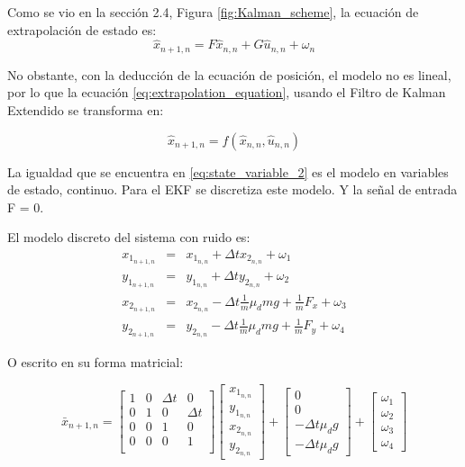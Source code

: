 Como se vio en la sección 2.4, Figura \ref{fig:Kalman_scheme}, la ecuación de extrapolación de estado es:
\begin{equation}
\hat{x}_{n+1,n} = F \hat{x}_{n,n} + G \hat{u}_{n,n} + \omega_n
\label{eq:extrapolation_equation}
\end{equation}

No obstante, con la deducción de la ecuación de posición, el modelo no es lineal, por lo que la ecuación \ref{eq:extrapolation_equation}, usando el Filtro de Kalman Extendido se transforma en:

\begin{equation}
\hat{x}_{n+1,n} = f(\hat{x}_{n,n}, \hat{u}_{n,n}) 
\label{eq:efk}
\end{equation}


La igualdad que se encuentra en \ref{eq:state_variable_2} es el modelo en variables de estado, continuo. Para el EKF se discretiza este modelo. Y la señal de entrada F = 0. 

El modelo discreto del sistema con ruido es:
\begin{eqnarray*}
x_{1_{n+1,n}} &=& x_{1_{n,n}} + \Delta t x_{2_{n,n}} + \omega_1\\ %
y_{1_{n+1,n}} &=& y_{1_{n,n}} + \Delta t y_{2_{n,n}} + \omega_2\\ %
x_{2_{n+1,n}} &=& x_{2_{n,n}} - \Delta t \frac{1}{m}\mu_d m g + \frac{1}{m} F_x + \omega_3\\ %
y_{2_{n+1,n}} &=& y_{2_{n,n}} - \Delta t \frac{1}{m}\mu_d m g + \frac{1}{m} F_y + \omega_4 %
\end{eqnarray*}

O escrito en su forma matricial:

\begin{equation}
\bar{x}_{n+1,n} =
\begin{bmatrix}
1 & 0 & \Delta t & 0\\ 
0 & 1 & 0 & \Delta t\\
0 & 0 & 1 & 0\\
0 & 0 & 0 & 1\\
\end{bmatrix}
\begin{bmatrix}
x_{1_{n,n}}\\ 
y_{1_{n,n}}\\
x_{2_{n,n}}\\
y_{2_{n,n}}
\end{bmatrix}
+
\begin{bmatrix}
0 \\
0 \\
- \Delta t \mu_d g \\
- \Delta t \mu_d g 
\end{bmatrix}
+
\begin{bmatrix}
\omega_1 \\ 
\omega_2 \\
\omega_3 \\
\omega_4
\end{bmatrix}
\end{equation}	

